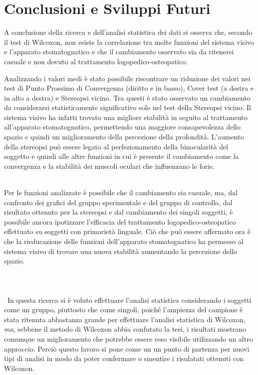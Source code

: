 \chapter{Conclusioni e Sviluppi Futuri}

A conclusione della ricerca e dell’analisi statistica dei dati si osserva che, secondo il test di Wilcoxon, non esiste la correlazione tra molte funzioni del sistema visivo e l’apparato stomatognatico e che il cambiamento osservato sia da ritenersi casuale e non dovuto al trattamento logopedico-osteopatico.
 
Analizzando i valori medi è stato possibile riscontrare un riduzione dei valori nei test di Punto Prossimo di Convergenza (diritto e in basso), Cover test (a destra e in alto a destra) e Stereopsi vicino. Tra questi è stato osservato un cambiamento da considerarsi statisticamente significativo solo nel test della Stereopsi vicino. Il sistema visivo ha infatti trovato una migliore stabilità in seguito al trattamento all’apparato stomatognatico, permettendo una maggiore consapevolezza dello spazio e quindi un miglioramento della percezione della profondità. L’aumento della stereopsi può essere legato al perfezionamento della binocularità del soggetto e quindi alle altre funzioni in cui è presente il cambiamento come la convergenza e la stabilità dei muscoli oculari che influenzano le forie.
\\\

Per le funzioni analizzate è possibile che il cambiamento sia casuale, ma, dal confronto dei grafici del gruppo sperimentale e del gruppo di controllo, dal risultato ottenuto per la stereopsi e dal cambiamento dei singoli soggetti, è possibile ancora ipotizzare l’efficacia del trattamento logopedico-osteopatico effettuato su soggetti con primarietà linguale. Ciò che può essere affermato ora è che la rieducazione delle funzioni dell’apparato stomatognatico ha permesso al sistema visivo di trovare una nuova stabilità aumentando la percezione dello spazio.
\\\ \\\ \\\ \\\
In questa ricerca si è voluto effettuare l’analisi statistica considerando i soggetti come un gruppo, piuttosto che come singoli, poiché l’ampiezza del campione è stata ritenuta abbastanza grande per effettuare l’analisi statistica di Wilcoxon, \emph{ma}, sebbene il metodo di  Wilcoxon  abbia confutato la tesi, i risultati mostrano comunque un miglioramento che potrebbe essere reso visibile utilizzando un altro approccio. Perciò questo lavoro si pone come un un punto di partenza per nuovi tipi di analisi in modo da poter confermare o smentire i risulatati ottenuti con Wilcoxon.
\\\ \\\ \\\ \\\
